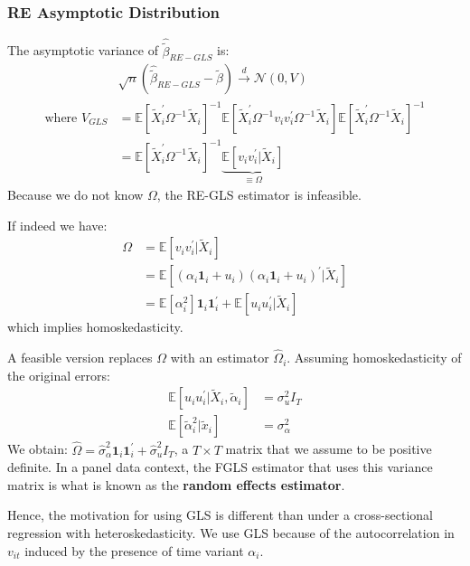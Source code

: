 \subsubsection{RE Asymptotic Distribution}
The asymptotic variance of $\hat{\tilde{\beta}}_{RE-GLS}$ is:
\begin{align*}
    &\sqrt{n} \left( \hat{\tilde{\beta}}_{RE-GLS} - \tilde{\beta} \right) \overset{d}{\rightarrow} \mathcal{N}\left(0, V \right) \\
    \text{where } V_{GLS}  &= \mathbb{E}\left[\tilde{X}_i^{\prime} \Omega^{-1} \tilde{X}_i \right]^{-1} \mathbb{E}\left[\tilde{X}_i^{\prime} \Omega^{-1} v_i v_i^{\prime} \Omega^{-1} \tilde{X}_i \right] \mathbb{E}\left[\tilde{X}_i^{\prime} \Omega^{-1} \tilde{X}_i \right]^{-1} \\
    &= \mathbb{E}\left[\tilde{X}_i^{\prime} \Omega^{-1} \tilde{X}_i \right]^{-1} \underset{\equiv \Omega}{\underbrace{\mathbb{E}[v_i v_i^{\prime} | \tilde{X}_i]}}
\end{align*}
Because we do not know $\Omega$, the RE-GLS estimator is infeasible. 

If indeed we have:
\begin{align*}
    \Omega &= \mathbb{E}[v_i v_i^{\prime}  | \tilde{X}_i] \\
    &= \mathbb{E}[(\alpha_i \mathbf{1}_i + u_i)(\alpha_i \mathbf{1}_i  + u_i)^{\prime}  | \tilde{X}_i] \\
    &= \mathbb{E}[\alpha_i^2] \mathbf{1}_i \mathbf{1}_i^{\prime} + \mathbb{E}[u_i u_i^{\prime} | \tilde{X}_i]
\end{align*}
which implies homoskedasticity.

A feasible version replaces $\Omega$ with an estimator $\hat{\Omega}_i$.
Assuming homoskedasticity of the original errors:
\begin{align*}
    \mathbb{E}[u_i u_i^{\prime}  | \tilde{X}_i, \tilde{\alpha}_i] &= \sigma_u^2 I_T \\
    \mathbb{E}[\tilde{\alpha}_i^2 | \tilde{x}_i] &= \sigma_{\alpha}^2
\end{align*}
We obtain: $\hat{\Omega} = \hat{\sigma}_{\alpha}^2 \mathbf{1}_i \mathbf{1}_i^{\prime} + \hat{\sigma}_u^2 I_T$, 
a $T \times T$ matrix that we assume to be positive definite.
In a panel data context, the FGLS estimator that uses this variance matrix is what is known as the \textbf{random effects estimator}.

Hence, the motivation for using GLS is different than under a cross-sectional regression with heteroskedasticity.
We use GLS because of the autocorrelation in $v_{it}$ induced by the presence of time variant $\alpha_i$.

